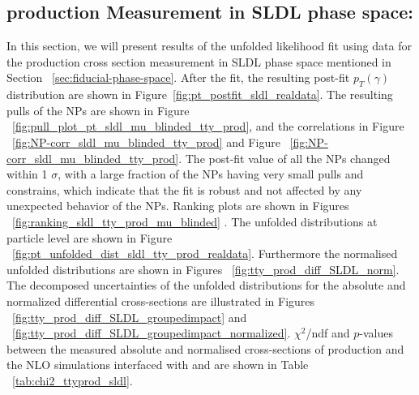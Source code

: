 \subsection{\tty production Measurement in SLDL phase space:}
\label{sec:tty_prod_sldl_measurement}

In this section, we will present results of the unfolded likelihood fit using data for the \tty production cross section measurement in SLDL phase space mentioned in Section ~\ref{sec:fiducial-phase-space}. After the fit, the resulting post-fit $p_T(\gamma)$ distribution are shown in Figure~\ref{fig:pt_postfit_sldl_realdata}. The resulting pulls of the NPs  are shown in Figure ~\ref{fig:pull_plot_pt_sldl_mu_blinded_tty_prod}, and the correlations in Figure ~\ref{fig:NP-corr_sldl_mu_blinded_tty_prod} and Figure ~\ref{fig:NP-corr_sldl_mu_blinded_tty_prod}. The post-fit value of all the NPs changed within 1 $\sigma$, with a large fraction of the NPs having very small pulls and constrains, which indicate that the fit is robust and not affected by any unexpected behavior of the NPs. Ranking plots are shown in Figures ~\ref{fig:ranking_sldl_tty_prod_mu_blinded} . The unfolded distributions at particle level are shown in Figure ~\ref{fig:pt_unfolded_dist_sldl_tty_prod_realdata}. Furthermore the normalised unfolded distributions are shown in Figures ~\ref{fig:tty_prod_diff_SLDL_norm}. The decomposed uncertainties of the unfolded distributions for the absolute and normalized differential cross-sections are illustrated in Figures ~\ref{fig:tty_prod_diff_SLDL_groupedimpact} and ~\ref{fig:tty_prod_diff_SLDL_groupedimpact_normalized}.   $\chi^2$/ndf and $p$-values between the measured absolute and normalised cross-sections of \tty production and the NLO \MGNLO simulations interfaced with \PYTHIA[8] and \HERWIG[7] are shown in Table ~\ref{tab:chi2_ttyprod_sldl}.



